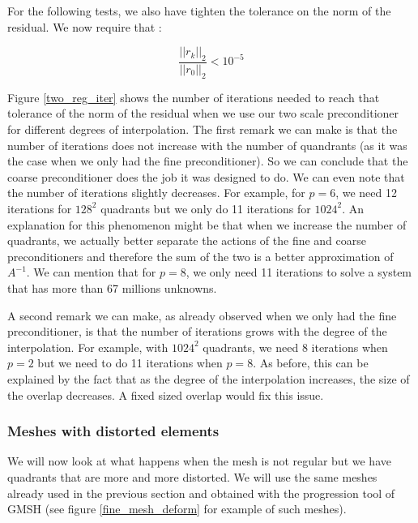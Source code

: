 For the following tests, we also have tighten the tolerance on the norm of the residual. We now require that : 

$$\frac{||r_k||_2}{||r_0||_2} < 10^{-5}$$

Figure \ref{two_reg_iter} shows the number of iterations needed to reach that tolerance of the norm of the residual when we use our two scale preconditioner for different degrees of interpolation. The first remark we can make is that the number of iterations does not increase with the number of quandrants (as it was the case when we only had the fine preconditioner). So we can conclude that the coarse preconditioner does the job it was designed to do. We can even note that the number of iterations slightly decreases. For example, for $p=6$, we need 12 iterations for $128^2$ quadrants but we only do 11 iterations for $1024^2$. An explanation for this phenomenon might be that when we increase the number of quadrants, we actually better separate the actions of the fine and coarse preconditioners and therefore the sum of the two is a better approximation of $A^{-1}$. We can mention that for $p=8$, we only need 11 iterations to solve a system that has more than 67 millions unknowns. 

A second remark we can make, as already observed when we only had the fine preconditioner, is that the number of iterations grows with the degree of the interpolation. For example, with $1024^2$ quadrants, we need 8 iterations when $p=2$ but we need to do 11 iterations when $p=8$. As before, this can be explained by the fact that as the degree of the interpolation increases, the size of the overlap decreases. A fixed sized overlap would fix this issue. 

\subsubsection{Meshes with distorted elements}

We will now look at what happens when the mesh is not regular but we have quadrants that are more and more distorted. We will use the same meshes already used in the previous section and obtained with the progression tool of GMSH (see figure \ref{fine_mesh_deform} for example of such meshes).

